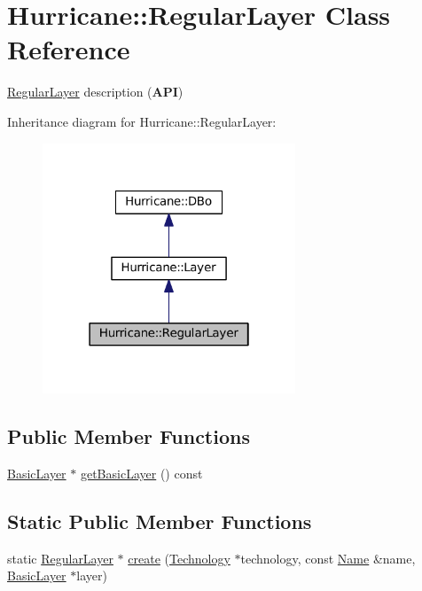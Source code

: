 \hypertarget{classHurricane_1_1RegularLayer}{}\section{Hurricane\+:\+:Regular\+Layer Class Reference}
\label{classHurricane_1_1RegularLayer}


\mbox{\hyperlink{classHurricane_1_1RegularLayer}{Regular\+Layer}} description ({\bfseries A\+PI})  




Inheritance diagram for Hurricane\+:\+:Regular\+Layer\+:\nopagebreak
\begin{figure}[H]
\begin{center}
\leavevmode
\includegraphics[width=214pt]{classHurricane_1_1RegularLayer__inherit__graph}
\end{center}
\end{figure}
\subsection*{Public Member Functions}
\begin{DoxyCompactItemize}
\item 
\mbox{\hyperlink{classHurricane_1_1BasicLayer}{Basic\+Layer}} $\ast$ \mbox{\hyperlink{classHurricane_1_1RegularLayer_a148c5839b544c2a0aa5d25be5958dfaf}{get\+Basic\+Layer}} () const
\end{DoxyCompactItemize}
\subsection*{Static Public Member Functions}
\begin{DoxyCompactItemize}
\item 
static \mbox{\hyperlink{classHurricane_1_1RegularLayer}{Regular\+Layer}} $\ast$ \mbox{\hyperlink{classHurricane_1_1RegularLayer_a6b40a35fec1c4fc168d608b8b96c8477}{create}} (\mbox{\hyperlink{classHurricane_1_1Technology}{Technology}} $\ast$technology, const \mbox{\hyperlink{classHurricane_1_1Name}{Name}} \&name, \mbox{\hyperlink{classHurricane_1_1BasicLayer}{Basic\+Layer}} $\ast$layer)
\end{DoxyCompactItemize}
